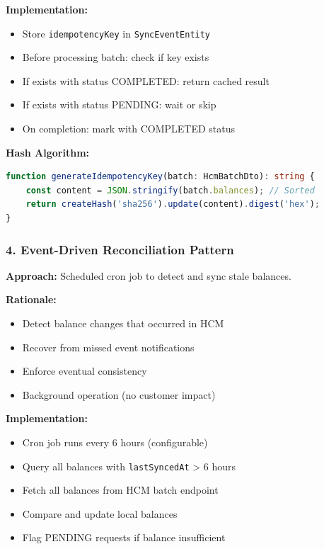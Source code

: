 \documentclass[12pt,a4paper]{article}
\begin{document}
\textbf{Implementation:}
\begin{itemize}
    \item Store \texttt{idempotencyKey} in \texttt{SyncEventEntity}
    \item Before processing batch: check if key exists
    \item If exists with status COMPLETED: return cached result
    \item If exists with status PENDING: wait or skip
    \item On completion: mark with COMPLETED status
\end{itemize}

\textbf{Hash Algorithm:}
\begin{lstlisting}[language=TypeScript]
function generateIdempotencyKey(batch: HcmBatchDto): string {
    const content = JSON.stringify(batch.balances); // Sorted
    return createHash('sha256').update(content).digest('hex');
}
\end{lstlisting}

\subsubsection{4. Event-Driven Reconciliation Pattern}

\textbf{Approach:} Scheduled cron job to detect and sync stale balances.

\textbf{Rationale:}
\begin{itemize}
    \item Detect balance changes that occurred in HCM
    \item Recover from missed event notifications
    \item Enforce eventual consistency
    \item Background operation (no customer impact)
\end{itemize}

\textbf{Implementation:}
\begin{itemize}
    \item Cron job runs every 6 hours (configurable)
    \item Query all balances with \texttt{lastSyncedAt} > 6 hours
    \item Fetch all balances from HCM batch endpoint
    \item Compare and update local balances
    \item Flag PENDING requests if balance insufficient
\end{itemize}
\end{document}
